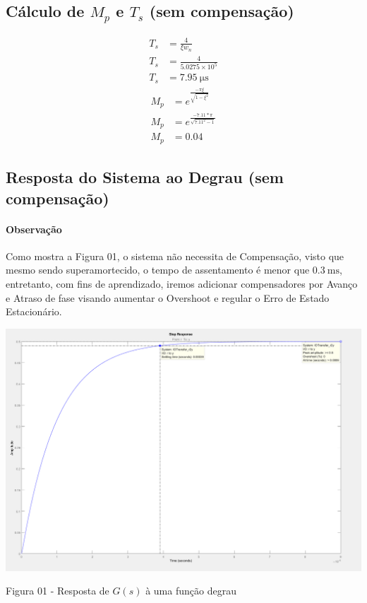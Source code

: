 \documentclass[a4paper]{article}
\begin{document}
	\subsection{Cálculo de $M_p$ e $T_s$ (sem compensação)}
	\begin{align}
	T_s &= \frac{4}{\xi w_n} \\
	T_s &= \frac{4}{5.0275\times10^5} \\
	T_s &= \SI{7.95}{\micro\second}
	\end{align}
	\vspace{0.5em}
	\begin{align}
	M_p &= e^{\frac{-\pi\xi}{\sqrt{1-\xi^2}}} \\
	M_p &= e^{\frac{-7.11*\pi}{\sqrt{7.11^2-1}}} \\
	M_p &= 0.04
	\end{align}  
	\subsection{Resposta do Sistema ao Degrau (sem compensação)}
	\paragraph{Observação} Como mostra a Figura 01, o sistema não necessita de Compensação, visto que mesmo sendo superamortecido, o tempo de assentamento é menor que $\SI{0.3}{\milli\second}$, entretanto, com fins de aprendizado, iremos adicionar compensadores por Avanço e Atraso de fase visando aumentar o Overshoot e regular o Erro de Estado Estacionário.
	\vspace{0.5em}
	\begin{center}
		\includegraphics[width=40em,keepaspectratio]{lugar_das_raizes_18_compensacao_requerimentos}
		\par Figura 01 - Resposta de $G(s)$ à uma função degrau
	\end{center}
\end{document}
